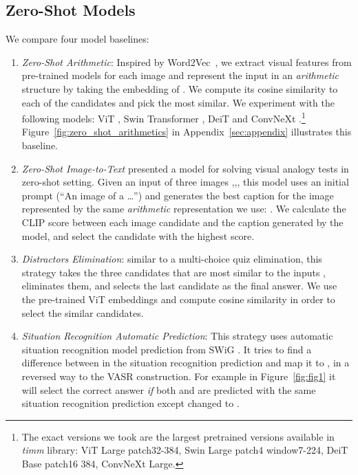 \documentclass[letterpaper]{article} \usepackage{aaai23}  \usepackage{times}  \usepackage{helvet}  \usepackage{courier}  \usepackage[hyphens]{url}  \usepackage{graphicx} \urlstyle{rm} \def\UrlFont{\rm}  \usepackage{natbib}  \usepackage{caption} \frenchspacing  \setlength{\pdfpagewidth}{8.5in}  \setlength{\pdfpageheight}{11in}  \usepackage{algorithm}
\newcommand{\zeroshot}[0]{\emph{Zero-Shot Arithmetic}}
\begin{document}
\subsection{Zero-Shot Models} 
We compare four model baselines:
\begin{enumerate}
    \item \zeroshot{}: Inspired by Word2Vec~\cite{mikolov2013linguistic}, we extract visual features from pre-trained models for each image and represent the input in an \emph{arithmetic} structure by taking the embedding of . We compute its cosine similarity to each of the candidates and pick the most similar. We experiment with the following models: ViT \cite{dosovitskiy2020image}, Swin Transformer \cite{liu2021swin}, DeiT \cite{touvron2021training} and ConvNeXt \cite{liu2022convnet}.\footnote{The exact versions we took are the largest pretrained versions available in \emph{timm} library: ViT Large patch32-384, Swin Large patch4 window7-224, DeiT Base patch16 384, ConvNeXt Large.} Figure~\ref{fig:zero_shot_arithmetics} in Appendix~\ref{sec:appendix} illustrates this baseline.
    \item \emph{Zero-Shot Image-to-Text} \cite{tewel2021zero}  presented a model  for  solving visual analogy tests in zero-shot setting. Given an input of three images ,,, this model uses an initial prompt (``An image of a \dots'') and generates the best caption for the image represented by the same \emph{arithmetic} representation we use: . We calculate the  CLIP score between each image candidate and the caption generated by the model, and select the candidate with the highest score.
    \item \emph{Distractors Elimination}: similar to a multi-choice quiz elimination, this strategy takes the three candidates that are most similar to the inputs , eliminates them, and selects the last candidate as the final answer. We use the pre-trained ViT embeddings and compute cosine similarity in order to select the similar candidates. 
    \item \emph{Situation Recognition Automatic Prediction}: This strategy uses automatic situation recognition model prediction from SWiG \cite{pratt2020grounded}. It tries to find a difference between  in the situation recognition prediction and map it to , in a reversed way to the VASR construction. For example in Figure~\ref{fig:fig1} it will select the correct answer \emph{if} both  and  are predicted with the same situation recognition prediction except  changed to .
\end{enumerate}
\end{document}
